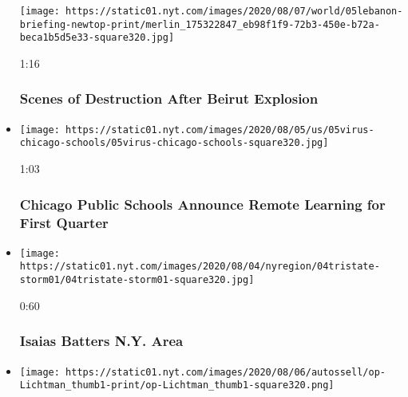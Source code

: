 \begin{itemize}
  \texttt{[image: https://static01.nyt.com/images/2020/08/07/world/05lebanon-briefing-newtop-print/merlin\_175322847\_eb98f1f9-72b3-450e-b72a-beca1b5d5e33-square320.jpg]}

  1:16

  \hypertarget{scenes-of-destruction-after-beirut-explosion}{%
  \subsubsection{Scenes of Destruction After Beirut
  Explosion}\label{scenes-of-destruction-after-beirut-explosion}}
\item
  \href{https://www.nytimes.com/video/us/100000007274410/chicago-public-schools-remote-learning.html?action=click\&module=video-series-bar\&region=header\&pgtype=Article\&playlistId=video/latest-video}{}

  \texttt{[image: https://static01.nyt.com/images/2020/08/05/us/05virus-chicago-schools/05virus-chicago-schools-square320.jpg]}

  1:03

  \hypertarget{chicago-public-schools-announce-remote-learning-for-first-quarter}{%
  \subsubsection{Chicago Public Schools Announce Remote Learning for
  First
  Quarter}\label{chicago-public-schools-announce-remote-learning-for-first-quarter}}
\item
  \href{https://www.nytimes.com/video/us/100000007273885/storm-isaias-new-york.html?action=click\&module=video-series-bar\&region=header\&pgtype=Article\&playlistId=video/latest-video}{}

  \texttt{[image: https://static01.nyt.com/images/2020/08/04/nyregion/04tristate-storm01/04tristate-storm01-square320.jpg]}

  0:60

  \hypertarget{isaias-batters-ny-area}{%
  \subsubsection{Isaias Batters N.Y.
  Area}\label{isaias-batters-ny-area}}
\item
  \href{https://www.nytimes.com/video/opinion/100000007227782/2020-election-prediction-allan-lichtman.html?action=click\&module=video-series-bar\&region=header\&pgtype=Article\&playlistId=video/latest-video}{}

  \texttt{[image: https://static01.nyt.com/images/2020/08/06/autossell/op-Lichtman\_thumb1-print/op-Lichtman\_thumb1-square320.png]}


\end{itemize}
